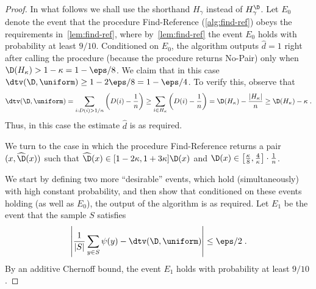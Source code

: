 \begin{proof}
In what follows we shall use the shorthand $H_\gamma$ instead of
$H^\D_\gamma$.
 Let $E_0$ denote the event that
the procedure {\sc Find-Reference} (\cref{alg:find-ref}) obeys the
requirements in~\cref{lem:find-ref}, where
by~\cref{lem:find-ref} the event $E_0$ holds
with  probability at least $9/10$. Conditioned
on $E_0$, the algorithm outputs $\hat{d} = 1$
right after calling the procedure (because the procedure returns
{\sf No-Pair}) only when $\D(H_\kappa) > 1-\kappa = 1-\eps/8$.
We claim that in this case $\dtv(\D,\uniform) \geq 1-2\eps/8=1-\eps/4$.
To verify this, observe that
\begin{equation}
\dtv(\D,\uniform) = \sum_{i:D(i)>1/n}\left(D(i) - \frac{1}{n}\right)
\geq \sum_{i \in H_\kappa} \left(D(i) - \frac{1}{n}\right) =
\D(H_\kappa) - \frac{|H_\kappa|}{n}
    \geq \D(H_\kappa) - \kappa\;.
\end{equation}
Thus, in this case the estimate $\hat{d}$ is as required.

We turn to the case in which the
procedure {\sc Find-Reference} returns a pair $(x,\widehat{\D}(x))$
such that $\widehat{\D}(x) \in [1-2\kappa,1+3\kappa]\D(x)$ and
$\D(x) \in \left[\frac{\kappa}{8},\frac{4}{\kappa}\right]\cdot \frac{1}{n}$.

We start by defining two more ``desirable'' events, which
hold (simultaneously) with high constant probability, and
then show that conditioned on these events holding (as well as $E_0$),
the output of the algorithm is as required.
Let $E_1$ be the event that the sample $S$ satisfies
\begin{equation}\label{eq:samp-S-eps}
\left|\frac{1}{|S|}\sum_{y\in S} \psi(y)- \dtv(\D,\uniform)\right|
\leq \eps/2\;.
\end{equation}
By an additive Chernoff bound, the event $E_1$ holds with probability
at least $9/10$.



\end{proof}
